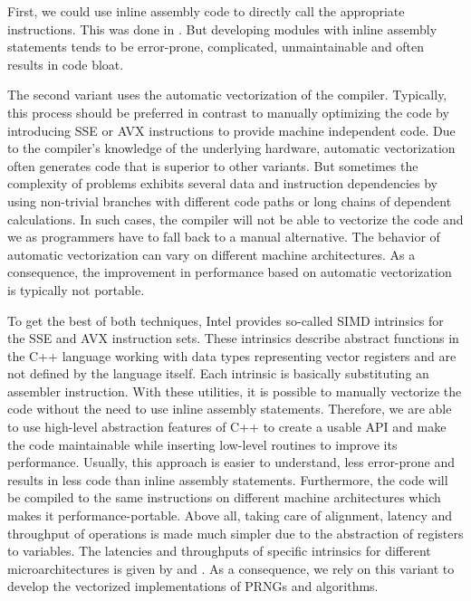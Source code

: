\documentclass{stdlocal}
\begin{document}
    First, we could use inline assembly code to directly call the appropriate instructions.
    This was done in \textcite{guskova2016,barash2017}.
    But developing modules with inline assembly statements tends to be error-prone, complicated, unmaintainable and often results in code bloat.

    The second variant uses the automatic vectorization of the compiler.
    Typically, this process should be preferred in contrast to manually optimizing the code by introducing SSE or AVX instructions to provide machine independent code.
    Due to the compiler's knowledge of the underlying hardware, automatic vectorization often generates code that is superior to other variants.
    But sometimes the complexity of problems exhibits several data and instruction dependencies by using non-trivial branches with different code paths or long chains of dependent calculations.
    In such cases, the compiler will not be able to vectorize the code and we as programmers have to fall back to a manual alternative.
    The behavior of automatic vectorization can vary on different machine architectures.
    As a consequence, the improvement in performance based on automatic vectorization is typically not portable.
    \autocite{fog2019a,fog2019b,fog2019c,fog2019d,fog2019e}

    To get the best of both techniques, Intel provides so-called SIMD intrinsics for the SSE and AVX instruction sets.
    These intrinsics describe abstract functions in the C++ language working with data types representing vector registers and are not defined by the language itself.
    Each intrinsic is basically substituting an assembler instruction.
    With these utilities, it is possible to manually vectorize the code without the need to use inline assembly statements.
    Therefore, we are able to use high-level abstraction features of C++ to create a usable API and make the code maintainable while inserting low-level routines to improve its performance.
    Usually, this approach is easier to understand, less error-prone and results in less code than inline assembly statements.
    Furthermore, the code will be compiled to the same instructions on different machine architectures which makes it performance-portable.
    Above all, taking care of alignment, latency and throughput of operations is made much simpler due to the abstraction of registers to variables.
    The latencies and throughputs of specific intrinsics for different microarchitectures is given by \textcite{intel-intrinsics-guide} and \textcite{fog2019d}.
    As a consequence, we rely on this variant to develop the vectorized implementations of PRNGs and algorithms.
    \autocite{intel-optimization-reference,fog2019a,fog2019b,fog2019c,fog2019d,fog2019e}
\end{document}
